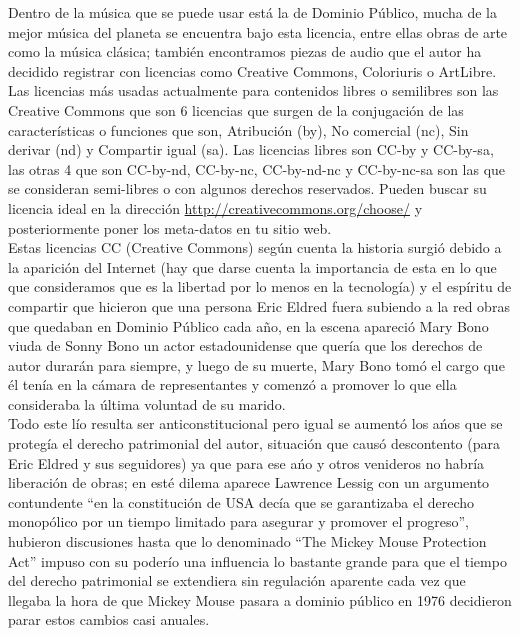 \begin{multicols}{2}
Dentro de la música que se puede usar está la de Dominio Público, mucha de la mejor música del planeta se encuentra bajo esta licencia, entre ellas obras de arte como la música clásica; también encontramos piezas de audio que el autor ha decidido registrar con licencias como Creative Commons, Coloriuris o ArtLibre.\\

Las licencias más usadas actualmente para contenidos libres o semilibres son las Creative Commons que son 6 licencias que surgen de la conjugación de las características o funciones que son, Atribución (by), No comercial (nc), Sin derivar (nd) y Compartir igual (sa). Las licencias libres\cite {ref2} son CC-by y CC-by-sa, las otras 4 que son CC-by-nd, CC-by-nc, CC-by-nd-nc y CC-by-nc-sa son las que se consideran semi-libres o con algunos derechos reservados. Pueden buscar su licencia ideal en la dirección \url{http://creativecommons.org/choose/} y posteriormente poner los meta-datos en tu sitio web.\\

Estas licencias CC (Creative Commons) según cuenta la historia surgió debido a la aparición del Internet (hay que darse cuenta la importancia de esta en lo que que consideramos que es la libertad por lo menos en la tecnología) y el espíritu de compartir que hicieron que una persona Eric Eldred fuera subiendo a la red obras que quedaban en Dominio Público cada año, en la escena apareció Mary Bono viuda de Sonny Bono un actor estadounidense que quería que los derechos de autor durarán para siempre, y luego de su muerte, Mary Bono tomó el cargo que él tenía en la cámara de representantes y comenzó a promover lo que ella consideraba la última voluntad de su marido.\\

Todo este lío resulta ser anticonstitucional pero igual se aumentó los ańos que se protegía el derecho patrimonial del autor, situación que causó descontento (para Eric Eldred y sus seguidores) ya que para ese ańo y otros venideros no habría liberación de obras; en esté dilema aparece Lawrence Lessig con un argumento contundente ``en la constitución de USA decía que se garantizaba el derecho monopólico por un tiempo limitado para asegurar y promover el progreso'', hubieron discusiones hasta que lo denominado ``The Mickey Mouse Protection Act''\cite {ref3} impuso con su poderío una influencia lo bastante grande para que el tiempo del derecho patrimonial se extendiera sin regulación aparente cada vez que llegaba la hora de que Mickey Mouse pasara a dominio público\cite {ref4} en 1976 decidieron parar estos cambios casi anuales. \\


\end{multicols}
